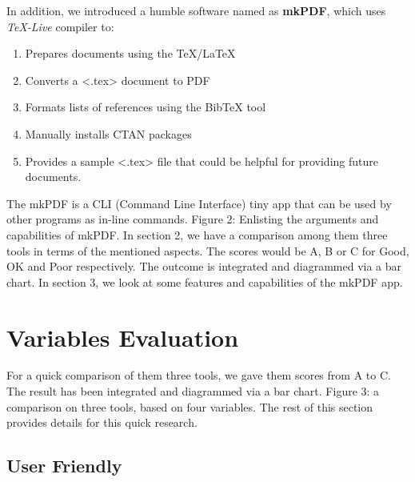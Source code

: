\documentclass[twocolumn]{article}
\begin{document}
In addition, we introduced a humble software named as \textbf{mkPDF}, which uses
\textit{TeX-Live} compiler to:
\begin{enumerate}
\item Prepares documents using the TeX/LaTeX
\item Converts a <.tex> document to PDF
\item Formats lists of references using the BibTeX tool
\item Manually installs CTAN packages
\item Provides a sample <.tex> file that could be helpful for providing future
documents.
\end{enumerate}
The mkPDF is a CLI (Command Line Interface) tiny app that can be used by other
programs as in-line commands.
\newline
Figure 2: Enlisting the arguments and capabilities of mkPDF.
\newline
In section 2, we have a comparison among them three tools in terms of the
mentioned aspects. The scores would be A, B or C for Good, OK and Poor
respectively. The outcome is integrated and diagrammed via a bar chart.
\newline
In section 3, we look at some features and capabilities of the mkPDF app.
\section{Variables Evaluation}
For a quick comparison of them three tools, we gave them scores from A to C. The
result has been integrated and diagrammed via a bar chart.
\newline
Figure 3: a comparison on three tools, based on four variables.
\newline
The rest of this section provides details for this quick research.
\subsection{User Friendly}
\end{document}
